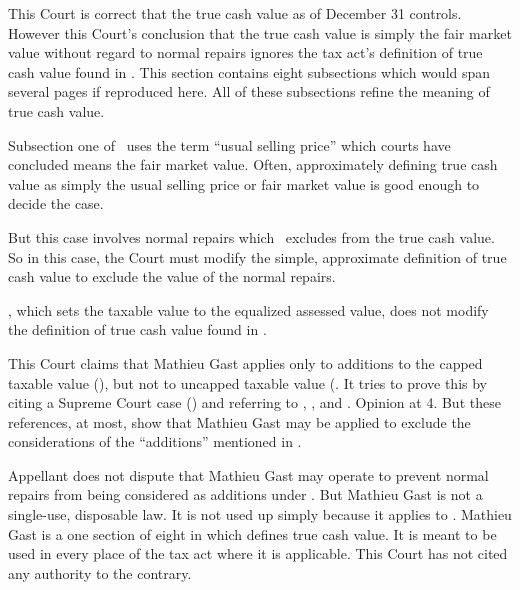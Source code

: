 \documentclass[12pt,\documentclassflag]{michiganCourtOfAppealsBrief}
\begin{document}
This Court is correct that the true cash value as of December 31 controls. However this Court's conclusion that the true cash value is simply the fair market value without regard to normal repairs ignores the tax act's definition of true cash value found in \cite[s]{MCL 211.27}. This section contains eight subsections which would span several pages if reproduced here. All of these subsections refine the meaning of true cash value.

Subsection one of \cite[s]{MCL 211.27}\ uses the term ``usual selling price'' which courts have concluded means the fair market value. Often, approximately defining true cash value as simply the usual selling price or fair market value is good enough to decide the case.

But this case involves normal repairs which \cite[s]{MCL 211.27(2)}\ excludes from the true cash value. So in this case, the Court must modify the simple, approximate definition of true cash value to exclude the value of the normal repairs.

\cite[s]{MCL 211.27a(3)}, which sets the taxable value to the equalized assessed value, does not modify the definition of true cash value found in \cite[s]{MCL 211.27}.


This Court claims that Mathieu Gast applies only to additions to the capped taxable value (), but not to uncapped taxable value (\cite{MCL 211.27a(3)}. It tries to prove this by citing a Supreme Court case () and referring to \cite{MCL 211.2(2)}, \cite{MCL 211.27a(1)}, and \cite{MCL 211.27a(3)}. Opinion at 4. But these references, at most, show that Mathieu Gast may be applied to exclude the considerations of the ``additions'' mentioned in .

Appellant does not dispute that Mathieu Gast may operate to prevent normal repairs from being considered as additions under \cite{MCL 211.27a(2)}. But Mathieu Gast is not a single-use, disposable law. It is not used up simply because it applies to . Mathieu Gast is a one section of eight in \cite{MCL 211.27} which defines true cash value. It is meant to be used in every place of the tax act where it is applicable. This Court has not cited any authority to the contrary.


\end{document}
